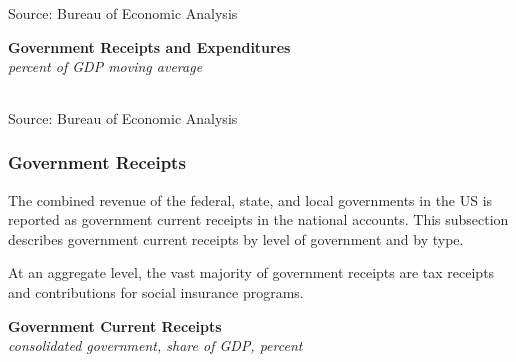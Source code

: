 \documentclass{report}
\newcommand{\tbllink}[1]{\href{https://raw.githubusercontent.com/bdecon/US-chartbook/master/chartbook/data/#1}{\faTable}}
\begin{document}
{\begin{minipage}{0.76\textwidth}
\footnotesize{Source: Bureau of Economic Analysis} \hfill \tbllink{fedgdp.csv} \ \tbllink{slggdp.csv}
\vspace{5mm}

\normalsize \textbf{Government Receipts and Expenditures}\\
\footnotesize{\textit{percent of GDP \hspace{75mm} moving average}}\\ 
 \setlength{\tabcolsep}{3.0pt} \color{black!90}
		{\renewcommand{\arraystretch}{1.5}
\hspace{-2mm} \begin{tabular}{p{35mm} R{7mm} R{7mm} R{7mm} R{7mm} R{7mm} R{7mm} 
		   R{7.2mm} R{7mm} R{7mm} }
			  \hline
		\end{tabular}}\vspace{-2mm}
		
\footnotesize{Source: Bureau of Economic Analysis}
\end{minipage} 
\newpage
\vspace*{-10mm}

\begin{minipage}{0.76\textwidth}
\subsubsection*{Government Receipts} 
\small The combined revenue of the federal, state, and local governments in the US is reported as government current receipts in the national accounts. This subsection describes government current receipts by level of government and by type. 

At an aggregate level, the vast majority of government receipts are tax receipts and contributions for social insurance programs. 
\vspace{0.5mm}

\normalsize \textbf{Government Current Receipts}\\
\footnotesize{\textit{consolidated government, share of GDP, percent}}
\vspace{2.95cm}


\end{minipage}}
\end{document}
